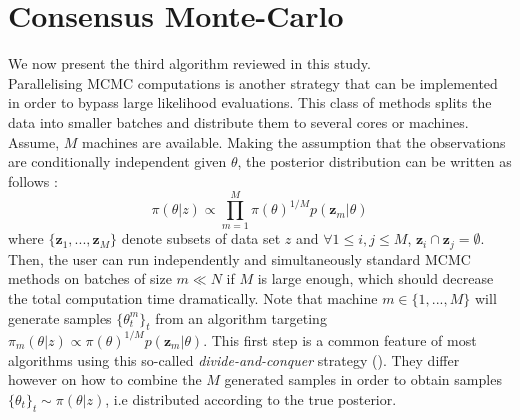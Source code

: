 \documentclass[11pt,a4paper]{report}\usepackage[]{graphicx}\usepackage[]{color}
\begin{document}
\section{Consensus Monte-Carlo}
\label{sec:consensus_exp}
We now present the third algorithm reviewed in this study.\\
Parallelising MCMC computations is another strategy that can be implemented in order to bypass large likelihood evaluations. This class of methods splits the data into smaller batches and distribute them to several cores or machines. 
Assume, $M$ machines are available. Making the assumption that the observations are conditionally independent given $\theta$, the posterior distribution can be written as follows :
  \begin{equation}
\label{eq:consensus1}
\pi(\theta|z)\propto\prod_{m=1}^M\pi(\theta)^{1/M}p(\textbf{z}_m|\theta)
\end{equation}
where $\{\textbf{z}_1, ..., \textbf{z}_M\}$ denote subsets of data set $z$ and $\forall 1\le i,j\le M$, $\textbf{z}_i\cap\textbf{z}_j=\emptyset$.
  Then, the user can run independently and simultaneously standard MCMC methods on batches of size $m\ll N$ if $M$ is large enough, which should decrease the total computation time dramatically. Note that machine $m\in\{1,...,M\}$ will generate samples $\{\theta_t^m\}_t$ from an algorithm targeting $\pi_m(\theta|z)\propto\pi(\theta)^{1/M}p(\textbf{z}_m|\theta)$. This first step is a common feature of most algorithms using this so-called \textit{divide-and-conquer} strategy (\cite{bardenet2017markov}). They differ however on how to combine the $M$ generated samples in order to obtain samples $\{\theta_t\}_t \sim \pi(\theta|z)$, i.e distributed according to the true posterior.\\
  
\end{document}
